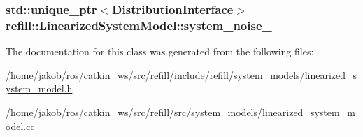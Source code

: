 \subsubsection[{\texorpdfstring{system\+\_\+noise\+\_\+}{system_noise_}}]{\setlength{\rightskip}{0pt plus 5cm}std\+::unique\+\_\+ptr$<${\bf Distribution\+Interface}$>$ refill\+::\+Linearized\+System\+Model\+::system\+\_\+noise\+\_\+\hspace{0.3cm}{\ttfamily [protected]}}\hypertarget{classrefill_1_1LinearizedSystemModel_abcb01be2aebea780081bd4ab23054688}{}\label{classrefill_1_1LinearizedSystemModel_abcb01be2aebea780081bd4ab23054688}


The documentation for this class was generated from the following files\+:\begin{DoxyCompactItemize}
\item 
/home/jakob/ros/catkin\+\_\+ws/src/refill/include/refill/system\+\_\+models/\hyperlink{linearized__system__model_8h}{linearized\+\_\+system\+\_\+model.\+h}\item 
/home/jakob/ros/catkin\+\_\+ws/src/refill/src/system\+\_\+models/\hyperlink{linearized__system__model_8cc}{linearized\+\_\+system\+\_\+model.\+cc}\end{DoxyCompactItemize}
